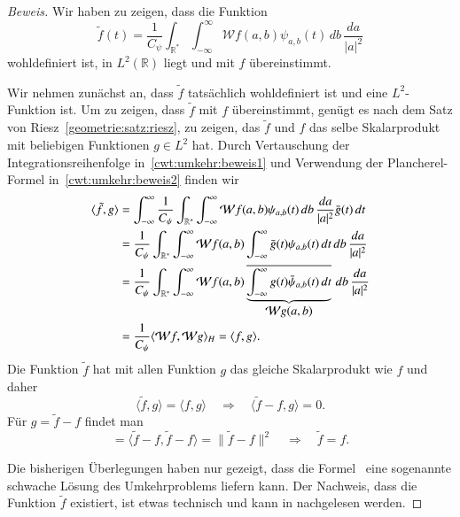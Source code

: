 \begin{proof}[Beweis]
Wir haben zu zeigen, dass die Funktion
\begin{equation}
\tilde{f}(t) = \frac{1}{C_{\psi}}\int_{\mathbb R^*}\int_{-\infty}^\infty
\mathcal{W}f(a,b) \psi_{a,b}(t)
\,db\,\frac{da}{|a|^2}
\end{equation}
wohldefiniert ist, in $L^2(\mathbb R)$ liegt  und mit $f$ übereinstimmt.

Wir nehmen zunächst an, dass $\tilde{f}$ tatsächlich wohldefiniert
ist und eine $L^2$-Funktion ist.
Um zu zeigen, dass $\tilde{f}$ mit $f$ übereinstimmt, genügt es nach
dem Satz von Riesz~\ref{geometrie:satz:riesz}, zu zeigen, das
$\tilde{f}$ und $f$ das selbe Skalarprodukt mit beliebigen Funktionen
$g\in L^2$ hat.
Durch Vertauschung der Integrationsreihenfolge in~\eqref{cwt:umkehr:beweis1}
und Verwendung der Plancherel-Formel in~\eqref{cwt:umkehr:beweis2}
finden wir
\begin{align}
\langle \tilde{f},g\rangle
&=
\int_{-\infty}^\infty
\frac1{C_{\psi}} \int_{\mathbb R^*}\int_{-\infty}^\infty
\mathcal{W}f(a,b)
\psi_{a,b}(t)
\,db\,\frac{da}{|a|^2}
\bar{g}(t)
\,dt
\notag
\\
&=
\frac1{C_{\psi}} \int_{\mathbb R^*}\int_{-\infty}^\infty
\mathcal{W}f(a,b)
\int_{-\infty}^\infty
\bar{g}(t)
\psi_{a,b}(t)
\,dt
\,db\,\frac{da}{|a|^2}
\label{cwt:umkehr:beweis1}
\\
&=
\frac1{C_{\psi}} \int_{\mathbb R^*}\int_{-\infty}^\infty
\mathcal{W}f(a,b)
\underbrace{
\overline{
\int_{-\infty}^\infty
g(t)
\bar{\psi}_{a,b}(t)
\,dt
}}_{\displaystyle\mathcal{W}g(a,b)}
\,db\,\frac{da}{|a|^2}
\notag
\\
&=
\frac{1}{C_{\psi}}
\langle \mathcal{W}f, \mathcal{W}g \rangle_H
=
\langle f, g\rangle.
\label{cwt:umkehr:beweis2}
\end{align}
Die Funktion $\tilde{f}$ hat mit allen Funktion $g$ das gleiche Skalarprodukt
wie $f$ und daher
\[
\langle \tilde{f},g\rangle = \langle f,g\rangle
\quad\Rightarrow\quad
\langle \tilde{f}-f,g\rangle = 0.
\]
Für $g=\tilde{f}-f$ findet man
\[
=
\langle \tilde{f}-f,\tilde{f}-f\rangle
=
\|\tilde{f}-f\|^2
\quad\Rightarrow\quad
\tilde{f}=f.
\]

Die bisherigen Überlegungen haben nur gezeigt, dass die
Formel~\label{cwt:umkehr} eine sogenannte schwache Lösung des Umkehrproblems
liefern kann.
Der Nachweis, dass die Funktion $\tilde{f}$ existiert,
ist etwas technisch und kann
in \cite{buch:daubechies} nachgelesen werden.
\end{proof}



